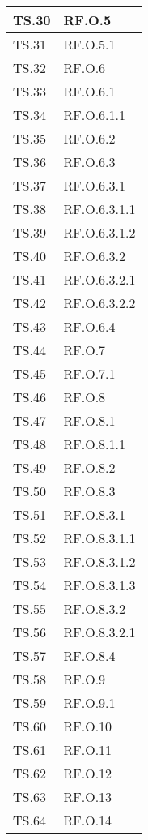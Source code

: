 {{{{{{{{{{\begin{tabularx}{\textwidth}{p{}|X}
    \hline
    TS.30 & RF.O.5 \\
    \hline
    TS.31 & RF.O.5.1 \\
    \hline
    TS.32 & RF.O.6 \\
    \hline
    TS.33 & RF.O.6.1 \\
    \hline
    TS.34 & RF.O.6.1.1 \\
    \hline
    TS.35 & RF.O.6.2 \\
    \hline
    TS.36 & RF.O.6.3 \\
    \hline
    TS.37 & RF.O.6.3.1 \\
    \hline
    TS.38 & RF.O.6.3.1.1 \\
    \hline
    TS.39 & RF.O.6.3.1.2 \\
    \hline
    TS.40 & RF.O.6.3.2 \\
    \hline
    TS.41 & RF.O.6.3.2.1 \\
    \hline
    TS.42 & RF.O.6.3.2.2 \\
    \hline
    TS.43 & RF.O.6.4 \\
    \hline
    TS.44 & RF.O.7 \\
    \hline
    TS.45 & RF.O.7.1 \\
    \hline
    TS.46 & RF.O.8 \\
    \hline
    TS.47 & RF.O.8.1 \\
    \hline
    TS.48 & RF.O.8.1.1 \\
    \hline
    TS.49 & RF.O.8.2 \\
    \hline
    TS.50 & RF.O.8.3 \\
    \hline
    TS.51 & RF.O.8.3.1 \\
    \hline
    TS.52 & RF.O.8.3.1.1 \\
    \hline
    TS.53 & RF.O.8.3.1.2 \\
    \hline
    TS.54 & RF.O.8.3.1.3 \\
    \hline
    TS.55 & RF.O.8.3.2 \\
    \hline
    TS.56 & RF.O.8.3.2.1 \\
    \hline
    TS.57 & RF.O.8.4 \\
    \hline
    TS.58 & RF.O.9 \\
    \hline
    TS.59 & RF.O.9.1 \\
    \hline
    TS.60 & RF.O.10 \\
    \hline
    TS.61 & RF.O.11 \\
    \hline
    TS.62 & RF.O.12 \\
    \hline
    TS.63 & RF.O.13 \\
    \hline
    TS.64 & RF.O.14 \\

\end{tabularx}}}}}}}}}}}
